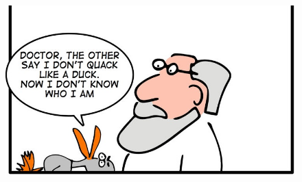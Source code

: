 \documentclass[xcolor ={table,usenames,dvipsnames}]{beamer}
\theoremstyle{definition}
\begin{document}
\begin{frame}[fragile]
	\begin{figure}[h!]
		\centering
		\includegraphics[scale=1.5]{img/doctor.jpg}
		\label{Interfacce di un CS}
	\end{figure}
\end{frame}




	

		
	
	

	
	
	
	
	
	
	
	
	
	
	
\end{document}
